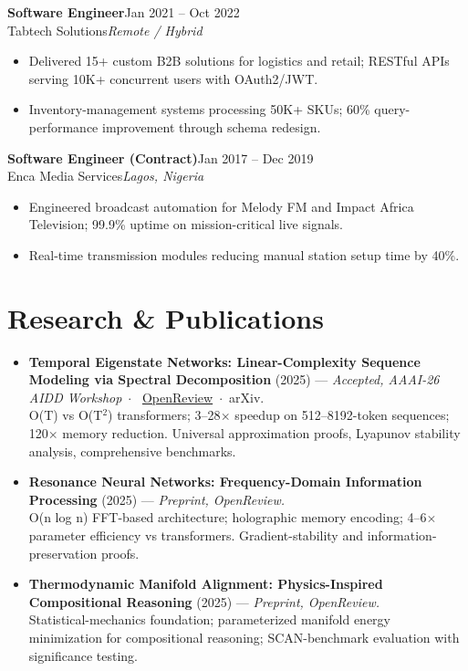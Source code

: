 \documentclass[10pt,a4paper]{article}
\newcommand{\sep}{\ $\cdot$\ }
\newcommand{\role}[4]{%
  \vspace{2pt}%
  {\bfseries #1}\hfill{\color{muted}#3}\\[1pt]%
  {\color{accent}#2}\hfill{\color{muted}\itshape #4}\par%
  \vspace{2pt}%
}
\begin{document}
\role{Software Engineer}{Tabtech Solutions}{Jan 2021 -- Oct 2022}{Remote / Hybrid}
\begin{itemize}
  \item Delivered 15+ custom B2B solutions for logistics and retail; RESTful APIs serving 10K+ concurrent
        users with OAuth2/JWT.
  \item Inventory-management systems processing 50K+ SKUs; 60\% query-performance improvement through schema redesign.
\end{itemize}

\role{Software Engineer (Contract)}{Enca Media Services}{Jan 2017 -- Dec 2019}{Lagos, Nigeria}
\begin{itemize}
  \item Engineered broadcast automation for Melody FM and Impact Africa Television; 99.9\% uptime on
        mission-critical live signals.
  \item Real-time transmission modules reducing manual station setup time by 40\%.
\end{itemize}

\section{Research \& Publications}
\begin{itemize}
  \item \textbf{Temporal Eigenstate Networks: Linear-Complexity Sequence Modeling via Spectral Decomposition}
        (2025) --- \textit{Accepted, AAAI-26 AIDD Workshop}\sep
        \href{https://openreview.net/forum?id=DGgt5mCyY3}{OpenReview}\sep arXiv.\\
        O(T) vs O(T$^2$) transformers; 3--28$\times$ speedup on 512--8192-token sequences; 120$\times$ memory
        reduction. Universal approximation proofs, Lyapunov stability analysis, comprehensive benchmarks.
  \item \textbf{Resonance Neural Networks: Frequency-Domain Information Processing} (2025) ---
        \textit{Preprint, OpenReview.}\\
        O(n log n) FFT-based architecture; holographic memory encoding; 4--6$\times$ parameter efficiency vs
        transformers. Gradient-stability and information-preservation proofs.
  \item \textbf{Thermodynamic Manifold Alignment: Physics-Inspired Compositional Reasoning} (2025) ---
        \textit{Preprint, OpenReview.}\\
        Statistical-mechanics foundation; parameterized manifold energy minimization for compositional
        reasoning; SCAN-benchmark evaluation with significance testing.
\end{itemize}
\end{document}
